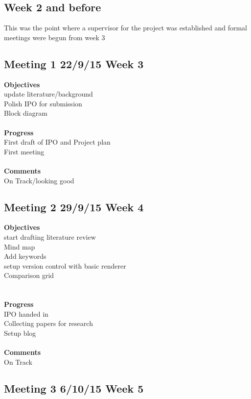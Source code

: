 \subsection{Week 2 and before}
This was the point where a supervisor for the project was established and formal meetings were begun from week 3

\subsection{Meeting 1 22/9/15 Week 3}

\textbf{Objectives}\\
update literature/background\\
Polish IPO for submission\\
Block diagram\\\\\textbf{Progress}\\
First draft of IPO and Project plan\\
First meeting\\\\\textbf{Comments}\\
On Track/looking good


\subsection{Meeting 2 29/9/15 Week 4}

\textbf{Objectives}\\
start drafting literature review\\
Mind map\\
Add keywords\\
setup version control with basic renderer\\
Comparison grid\\
\\\\\textbf{Progress}\\
IPO handed in\\
Collecting papers for research\\
Setup blog\\\\\textbf{Comments}\\
On Track


\subsection{Meeting 3 6/10/15 Week 5}

